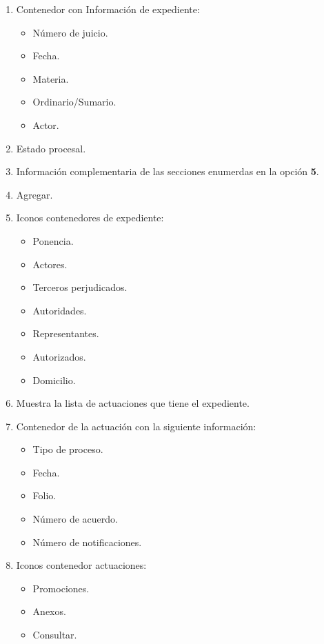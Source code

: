 \documentclass[12pt, a4paper,oneside, openany]{book}
\begin{document}
\begin{enumerate}

	\item Contenedor con Información de expediente:

	\begin{itemize}
	    \item Número de juicio.
    	\item Fecha.
	    \item Materia.
    	\item Ordinario/Sumario.
	    \item Actor.
	\end{itemize}

	\item Estado procesal.

	\item Información complementaria de las secciones enumerdas en la opción {\bf 5}.

	\item Agregar.

	\item Iconos contenedores de expediente:
		\begin{itemize}
	    \item Ponencia.
    	\item Actores.
	    \item Terceros perjudicados.
	    \item Autoridades.
	    \item Representantes.
	    \item Autorizados.
	    \item Domicilio.
	\end{itemize}

	\item Muestra la lista de actuaciones que tiene el expediente.

	\item Contenedor de la actuación con la siguiente información:
		\begin{itemize}
		    \item Tipo de proceso.
		    \item Fecha.
		    \item Folio.
		    \item Número de acuerdo.
		    \item Número de notificaciones.
		\end{itemize}

	\item Iconos contenedor actuaciones:
		\begin{itemize}
		    \item Promociones.
		    \item Anexos.
		    \item Consultar.
		\end{itemize}
\end{enumerate}
\end{document}
